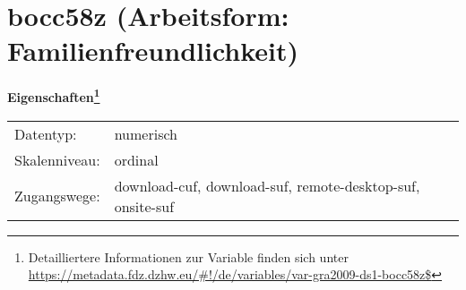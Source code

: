 
    \setcounter{footnote}{0}

    \vspace*{-1.8cm}
	\section{bocc58z (Arbeitsform: Familienfreundlichkeit)}
	\label{section:bocc58z}



    \vspace*{0.5cm}
    \noindent\textbf{Eigenschaften\footnote{Detailliertere Informationen zur Variable finden sich unter
		\url{https://metadata.fdz.dzhw.eu/\#!/de/variables/var-gra2009-ds1-bocc58z$}}}\\
	\begin{tabularx}{\hsize}{@{}lX}
	Datentyp: & numerisch \\
	Skalenniveau: & ordinal \\
	Zugangswege: &
	  download-cuf, 
	  download-suf, 
	  remote-desktop-suf, 
	  onsite-suf
 \\
    \end{tabularx}



